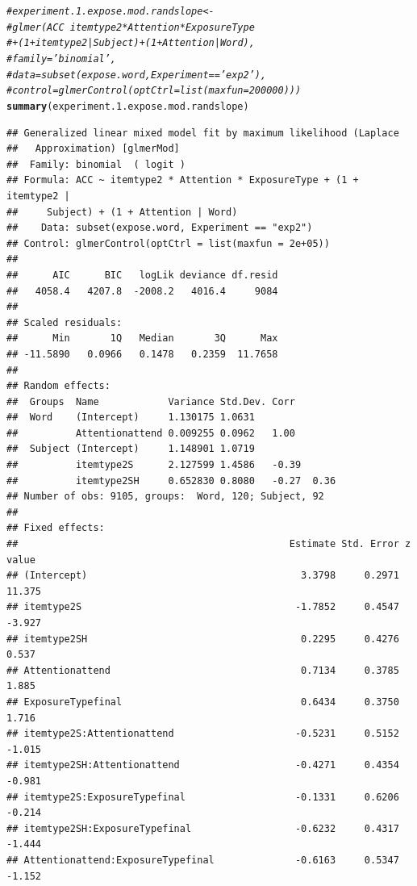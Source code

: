 \documentclass[11pt]{article}\usepackage[]{graphicx}\usepackage[]{color}
\makeatletter
\newcommand{\hlcom}[1]{\textcolor[rgb]{0.678,0.584,0.686}{\textit{#1}}}%
\newcommand{\hlstd}[1]{\textcolor[rgb]{0.345,0.345,0.345}{#1}}%
\newcommand{\hlkwd}[1]{\textcolor[rgb]{0.737,0.353,0.396}{\textbf{#1}}}%
\newenvironment{kframe}{%
 \def\at@end@of@kframe{}%
 \ifinner\ifhmode%
  \def\at@end@of@kframe{\end{minipage}}%
  \begin{minipage}{\columnwidth}%
 \fi\fi%
 \def\FrameCommand##1{\hskip\@totalleftmargin \hskip-\fboxsep
 \colorbox{shadecolor}{##1}\hskip-\fboxsep
     \hskip-\linewidth \hskip-\@totalleftmargin \hskip\columnwidth}%
 \MakeFramed {\advance\hsize-\width
   \@totalleftmargin\z@ \linewidth\hsize
   \@setminipage}}%
 {\par\unskip\endMakeFramed%
 \at@end@of@kframe}
\newenvironment{knitrout}{}{} %
\makeatother
\begin{document}
\begin{knitrout}\footnotesize
{}\color{fgcolor}\begin{kframe}
\begin{alltt}
 \hlcom{#experiment.1.expose.mod.randslope <- }
 \hlcom{#glmer(ACC ~ itemtype2*Attention*ExposureType }
 \hlcom{#+ (1+itemtype2|Subject) + (1+Attention|Word),}
 \hlcom{#family='binomial', }
 \hlcom{#data = subset(expose.word, Experiment=='exp2'),}
 \hlcom{#control = glmerControl(optCtrl=list(maxfun=200000) ))}
 \hlkwd{summary}\hlstd{(experiment.1.expose.mod.randslope)}
\end{alltt}
\begin{verbatim}
## Generalized linear mixed model fit by maximum likelihood (Laplace
##   Approximation) [glmerMod]
##  Family: binomial  ( logit )
## Formula: ACC ~ itemtype2 * Attention * ExposureType + (1 + itemtype2 |  
##     Subject) + (1 + Attention | Word)
##    Data: subset(expose.word, Experiment == "exp2")
## Control: glmerControl(optCtrl = list(maxfun = 2e+05))
## 
##      AIC      BIC   logLik deviance df.resid 
##   4058.4   4207.8  -2008.2   4016.4     9084 
## 
## Scaled residuals: 
##      Min       1Q   Median       3Q      Max 
## -11.5890   0.0966   0.1478   0.2359  11.7658 
## 
## Random effects:
##  Groups  Name            Variance Std.Dev. Corr       
##  Word    (Intercept)     1.130175 1.0631              
##          Attentionattend 0.009255 0.0962   1.00       
##  Subject (Intercept)     1.148901 1.0719              
##          itemtype2S      2.127599 1.4586   -0.39      
##          itemtype2SH     0.652830 0.8080   -0.27  0.36
## Number of obs: 9105, groups:  Word, 120; Subject, 92
## 
## Fixed effects:
##                                               Estimate Std. Error z value
## (Intercept)                                     3.3798     0.2971  11.375
## itemtype2S                                     -1.7852     0.4547  -3.927
## itemtype2SH                                     0.2295     0.4276   0.537
## Attentionattend                                 0.7134     0.3785   1.885
## ExposureTypefinal                               0.6434     0.3750   1.716
## itemtype2S:Attentionattend                     -0.5231     0.5152  -1.015
## itemtype2SH:Attentionattend                    -0.4271     0.4354  -0.981
## itemtype2S:ExposureTypefinal                   -0.1331     0.6206  -0.214
## itemtype2SH:ExposureTypefinal                  -0.6232     0.4317  -1.444
## Attentionattend:ExposureTypefinal              -0.6163     0.5347  -1.152

\end{verbatim}
\end{kframe}
\end{knitrout}
\end{document}
